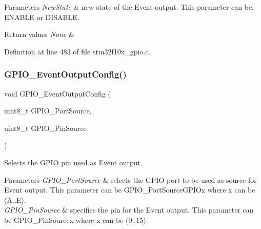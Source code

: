 \begin{DoxyParams}{Parameters}
{\em New\+State} & new state of the Event output. This parameter can be\+: E\+N\+A\+B\+LE or D\+I\+S\+A\+B\+LE. \\
\hline
\end{DoxyParams}

\begin{DoxyRetVals}{Return values}
{\em None} & \\
\hline
\end{DoxyRetVals}


Definition at line 483 of file stm32f10x\+\_\+gpio.\+c.

\mbox{\label{group___g_p_i_o___exported___functions_ga935f31ed7a86c6cb594cf34313b4b7af}} 
\subsubsection{\texorpdfstring{G\+P\+I\+O\+\_\+\+Event\+Output\+Config()}{GPIO\_EventOutputConfig()}}
{\footnotesize\ttfamily void G\+P\+I\+O\+\_\+\+Event\+Output\+Config (\begin{DoxyParamCaption}\item[{uint8\+\_\+t}]{G\+P\+I\+O\+\_\+\+Port\+Source,  }\item[{uint8\+\_\+t}]{G\+P\+I\+O\+\_\+\+Pin\+Source }\end{DoxyParamCaption})}



Selects the G\+P\+IO pin used as Event output. 


\begin{DoxyParams}{Parameters}
{\em G\+P\+I\+O\+\_\+\+Port\+Source} & selects the G\+P\+IO port to be used as source for Event output. This parameter can be G\+P\+I\+O\+\_\+\+Port\+Source\+G\+P\+I\+Ox where x can be (A..E). \\
\hline
{\em G\+P\+I\+O\+\_\+\+Pin\+Source} & specifies the pin for the Event output. This parameter can be G\+P\+I\+O\+\_\+\+Pin\+Sourcex where x can be (0..15). \\
\hline
\end{DoxyParams}

